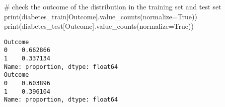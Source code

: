 \documentclass[
  letterpaper,
  DIV=11,
  numbers=noendperiod]{scrreprt}
\newenvironment{Shaded}{\begin{snugshade}}{\end{snugshade}}
\newcommand{\BuiltInTok}[1]{\textcolor[rgb]{0.00,0.23,0.31}{#1}}
\newcommand{\CommentTok}[1]{\textcolor[rgb]{0.37,0.37,0.37}{#1}}
\newcommand{\NormalTok}[1]{\textcolor[rgb]{0.00,0.23,0.31}{#1}}
\newcommand{\OperatorTok}[1]{\textcolor[rgb]{0.37,0.37,0.37}{#1}}
\newcommand{\StringTok}[1]{\textcolor[rgb]{0.13,0.47,0.30}{#1}}
\newcommand{\VariableTok}[1]{\textcolor[rgb]{0.07,0.07,0.07}{#1}}
\begin{document}
\begin{Shaded}
\begin{Highlighting}[]
\CommentTok{\# check the outcome of the distribution in the training set and test set}
\BuiltInTok{print}\NormalTok{(diabetes\_train[}\StringTok{\textquotesingle{}Outcome\textquotesingle{}}\NormalTok{].value\_counts(normalize}\OperatorTok{=}\VariableTok{True}\NormalTok{))}
\BuiltInTok{print}\NormalTok{(diabetes\_test[}\StringTok{\textquotesingle{}Outcome\textquotesingle{}}\NormalTok{].value\_counts(normalize}\OperatorTok{=}\VariableTok{True}\NormalTok{))}
\end{Highlighting}
\end{Shaded}

\begin{verbatim}
Outcome
0    0.662866
1    0.337134
Name: proportion, dtype: float64
Outcome
0    0.603896
1    0.396104
Name: proportion, dtype: float64
\end{verbatim}
\end{document}
